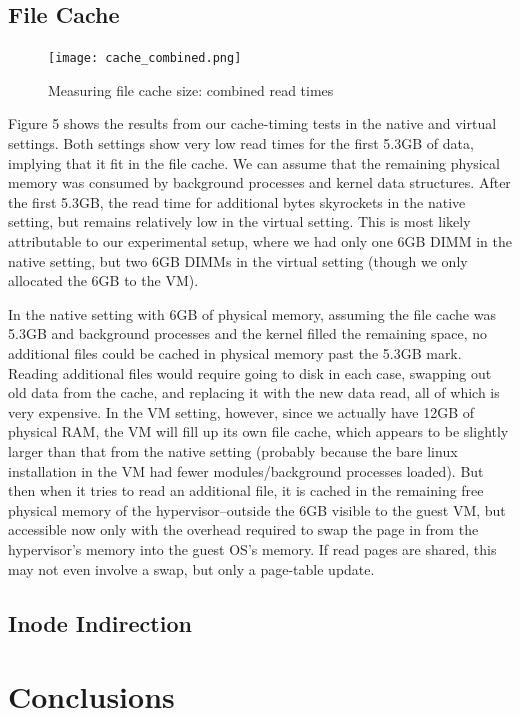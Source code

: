 \documentclass[letterpaper,twocolumn,10pt]{article}
\begin{document}
\subsection{File Cache}
\begin{figure}[!ht]
\texttt{[image: cache\_combined.png]}
\caption{Measuring file cache size: combined read times}
\end{figure}
Figure 5 shows the results from our cache-timing tests in the native and virtual settings. Both settings show very low read times for the first 5.3GB of data, implying that it fit in the file cache. We can assume that the remaining physical memory was consumed by background processes and kernel data structures. After the first 5.3GB, the read time for additional bytes skyrockets in the native setting, but remains relatively low in the virtual setting. This is most likely attributable to our experimental setup, where we had only one 6GB DIMM in the native setting, but two 6GB DIMMs in the virtual setting (though we only allocated the 6GB to the VM). 

In the native setting with 6GB of physical memory, assuming the file cache was 5.3GB and background processes and the kernel filled the remaining space, no additional files could be cached in physical memory past the 5.3GB mark. Reading additional files would require going to disk in each case, swapping out old data from the cache, and replacing it with the new data read, all of which is very expensive. In the VM setting, however, since we actually have 12GB of physical RAM, the VM will fill up its own file cache, which appears to be slightly larger than that from the native setting (probably because the bare linux installation in the VM had fewer modules/background processes loaded). But then when it tries to read an additional file, it is cached in the remaining free physical memory of the hypervisor--outside the 6GB visible to the guest VM, but accessible now only with the overhead required to swap the page in from the hypervisor's memory into the guest OS's memory. If read pages are shared, this may not even involve a swap, but only a page-table update. 

\subsection{Inode Indirection}

\section{Conclusions}

{\footnotesize 
}

\theendnotes
\end{document}
